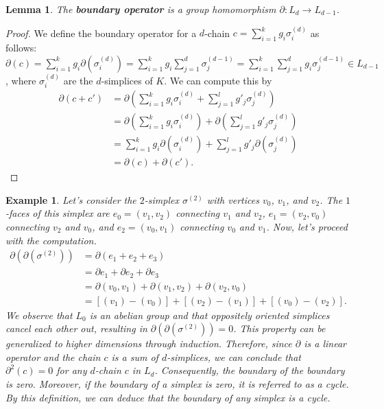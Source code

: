 \documentclass{article}
\newtheorem{lemma}[definition]{Lemma}
\newtheorem{example}[definition]{Example}
\begin{document}
\begin{lemma}
The \textbf{boundary operator} is a group homomorphism $\partial: L_d \rightarrow L_{d-1}$.
\end{lemma}
\begin{proof}
We define the boundary operator for a $d$-chain $c = \sum_{i=1}^{k} g_i \sigma_i^{(d)}$ as follows: $\partial(c) = \sum_{i=1}^{k} g_i \partial(\sigma_i^{(d)}) = \sum_{i=1}^{k} g_i \sum_{j=1}^{d} \sigma_j^{(d-1)} = \sum_{i=1}^{k} \sum_{j=1}^{d} g_i \sigma_j^{(d-1)} \in L_{d-1}$, where $\sigma_i^{(d)}$ are the $d$-simplices of $K$. We can compute this by
\begin{align}
\partial(c + c') &= \partial(\sum_{i=1}^{k} g_i \sigma_i^{(d)} + \sum_{j=1}^{l} g'_j \sigma_j^{(d)}) \\
&= \partial\left(\sum_{i=1}^{k} g_i \sigma_i^{(d)}\right) + \partial\left(\sum_{j=1}^{l} g'_j \sigma_j^{(d)}\right) \\
&= \sum_{i=1}^{k} g_i \partial(\sigma_i^{(d)}) + \sum_{j=1}^{l} g'_j \partial(\sigma_j^{(d)}) \\
&= \partial(c) + \partial(c').
\end{align}
\end{proof}

\begin{example}
Let's consider the $2$-simplex $\sigma^{(2)}$ with vertices $v_0$, $v_1$, and $v_2$. The $1$-faces of this simplex are $e_0 = (v_1,v_2)$ connecting $v_1$ and $v_2$, $e_1 = (v_2,v_0)$ connecting $v_2$ and $v_0$, and $e_2 = (v_0,v_1)$ connecting $v_0$ and $v_1$. Now, let's proceed with the computation.
\begin{align}
\partial(\partial(\sigma^{(2)})) &= \partial (e_1+e_2+e_3) \\
&= \partial e_1 + \partial e_2 + \partial e_3 \\
&= \partial(v_0,v_1) + \partial(v_1,v_2) + \partial(v_2,v_0) \\
&= [(v_1)-(v_0)] + [(v_2)-(v_1)]+[(v_0)-(v_2)].
\end{align}
We observe that $L_0$ is an abelian group and that oppositely oriented simplices cancel each other out, resulting in $\partial(\partial(\sigma^{(2)})) = 0$. This property can be generalized to higher dimensions through induction. Therefore, since $\partial$ is a linear operator and the chain $c$ is a sum of $d$-simplices, we can conclude that $\partial^2(c) = 0$ for any $d$-chain $c$ in $L_d$. Consequently, the boundary of the boundary is zero. Moreover, if the boundary of a simplex is zero, it is referred to as a \emph{cycle}. By this definition, we can deduce that the boundary of any simplex is a cycle.
\end{example}
\end{document}
